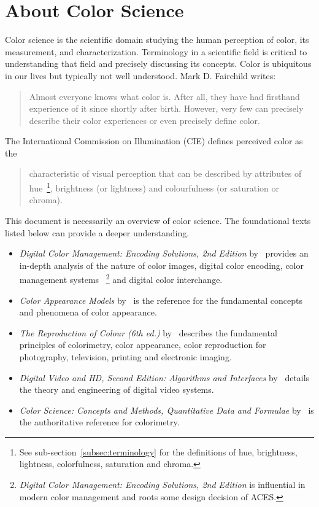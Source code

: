 \section{About Color Science}
\label{sec:about-color-science}

Color science is the scientific domain studying the human perception of color,
its measurement, and characterization. Terminology in a scientific field is
critical to understanding that field and precisely discussing its concepts.
Color is ubiquitous in our lives but typically not well understood.
\ccpar{}
Mark D. Fairchild writes:~\blockcquote[85]{Fairchild2013u}{Almost everyone
knows what color is. After all, they have had firsthand experience of it since
shortly after birth. However, very few can precisely describe their color
experiences or even precisely define color.}
\ccpar{}
The International Commission on Illumination (CIE) defines perceived color as
the~\blockcquote{CIEbk}{characteristic of visual perception that can be
described by attributes of hue~\footnote{See sub-section~\ref{subsec:terminology}
for the definitions of hue, brightness, lightness, colorfulness, saturation and
chroma.}, brightness (or lightness) and colourfulness (or saturation or
chroma).}
\ccpar{}
This document is necessarily an overview of color science. The foundational
texts listed below can provide a deeper understanding.
\begin{itemize}
    \item \textit{Digital Color Management: Encoding Solutions, 2nd Edition}
by~\textcite{Madden2007} provides an in-depth analysis of the nature of color
images, digital color encoding, color management systems
~\footnote{\textit{Digital Color Management: Encoding Solutions, 2nd Edition}
is influential in modern color management and roots some design decision of
ACES.} and digital color interchange.
    \item \textit{Color Appearance Models}
by~\textcite{Fairchild2013u} is the reference for the fundamental concepts and
phenomena of color appearance.
    \item \textit{The Reproduction of Colour (6th ed.)}
by~\textcite{Hunt2004b} describes the fundamental principles of colorimetry,
color appearance, color reproduction for photography, television, printing and
electronic imaging.
    \item \textit{Digital Video and HD, Second Edition: Algorithms and Interfaces}
by~\textcite{Poynton2012} details the theory and engineering of digital video
systems.
    \item \textit{Color Science: Concepts and Methods, Quantitative Data and Formulae}
by~\textcite{Wyszecki2000bi} is the authoritative reference for colorimetry.
\end{itemize}

